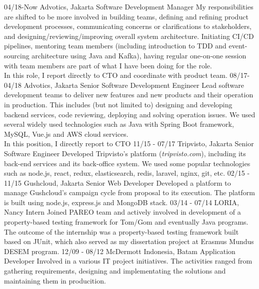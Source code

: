 \documentclass[]{friggeri-cv}
\begin{document}
\begin{entrylist}
  \entry
    {04/18-Now}
    {Advotics, Jakarta}
    {Software Development Manager}
    {My responsibilities are shifted to be more involved in building teams,
	defining and refining product development processes, communicating concerns or clarifications to stakeholders,
	and designing/reviewing/improving overall system architecture. Initiating CI/CD pipelines, mentoring team members
	(including introduction to TDD and event-sourcing architecture using Java and Kafka),
	having regular one-on-one session with team members are part of what I have been doing for the role.\\
	In this role, I report directly to CTO and coordinate with product team.}
  \entry
    {08/17-04/18}
    {Advotics, Jakarta}
    {Senior Software Development Engineer}
    {Lead software development teams to deliver new features and new products and their operation in production.
	This includes (but not limited to) designing and developing backend services, code reviewing, deploying and solving operation issues.
	We used several widely used technologies such as Java with Spring Boot framework, MySQL, Vue.js and AWS cloud services.\\
	In this position, I directly report to CTO}
  \entry
    {11/15 - 07/17}
    {Tripvisto, Jakarta}
    {Senior Software Engineer}
	{Developed Tripvisto's platform (\emph{tripvisto.com}), including its back-end services and its back-office system.
	We used some popular technologies such as node.js, react, redux, elasticsearch, redis, laravel, nginx, git, etc.}
  \entry
	{02/15 - 11/15}
	{Gushcloud, Jakarta}
	{Senior Web Developer}
	{Developed a platform to manage Gushcloud's campaign cycle from proposal to its execution. The platform
	is built using node.js, express.js and MongoDB stack.}
  \entry
	{03/14 - 07/14}
	{LORIA, Nancy}
	{Intern}
	{Joined PAREO team and actively involved in development of a property-based testing framework for Tom/Gom
	and eventually Java programs. The outcome of the internship was a property-based testing framework built based
	on JUnit, which also served as my dissertation project at Erasmus Mundus DESEM program.}
  \entry
	{12/09 - 08/12}
	{McDermott Indonesia, Batam}
	{Application Developer}
	{Involved in a various IT project initiatives. The activities ranged from gathering requirements, designing and implementating the solutions
	and maintaining them in producition.}
\end{entrylist}
\end{document}
